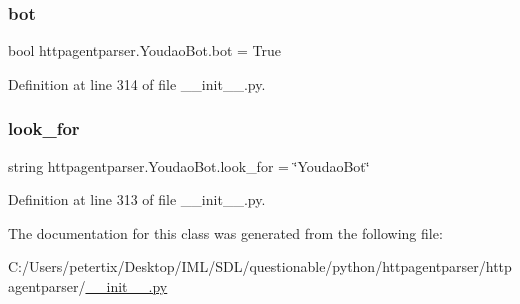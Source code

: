 \subsubsection{\texorpdfstring{bot}{bot}}
{\footnotesize\ttfamily bool httpagentparser.\+Youdao\+Bot.\+bot = True\hspace{0.3cm}{\ttfamily [static]}}



Definition at line 314 of file \+\_\+\+\_\+init\+\_\+\+\_\+.\+py.

\hypertarget{classhttpagentparser_1_1_youdao_bot_a9ea724988537ace0b01890a8c5683d01}{}\label{classhttpagentparser_1_1_youdao_bot_a9ea724988537ace0b01890a8c5683d01} 
\subsubsection{\texorpdfstring{look\+\_\+for}{look\_for}}
{\footnotesize\ttfamily string httpagentparser.\+Youdao\+Bot.\+look\+\_\+for = \char`\"{}Youdao\+Bot\char`\"{}\hspace{0.3cm}{\ttfamily [static]}}



Definition at line 313 of file \+\_\+\+\_\+init\+\_\+\+\_\+.\+py.



The documentation for this class was generated from the following file\+:\begin{DoxyCompactItemize}
\item 
C\+:/\+Users/petertix/\+Desktop/\+I\+M\+L/\+S\+D\+L/questionable/python/httpagentparser/httpagentparser/\hyperlink{____init_____8py}{\+\_\+\+\_\+init\+\_\+\+\_\+.\+py}\end{DoxyCompactItemize}
